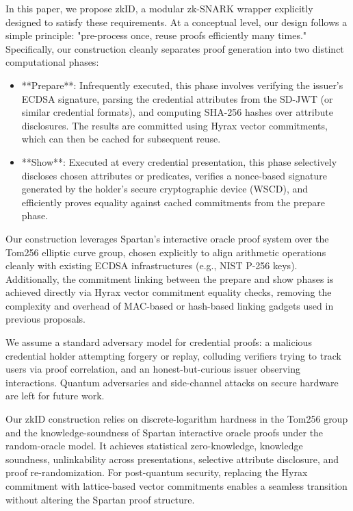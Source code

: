 In this paper, we propose zkID, a modular zk-SNARK wrapper explicitly designed to satisfy these requirements. At a conceptual level, our design follows a simple principle: "pre-process once, reuse proofs efficiently many times." Specifically, our construction cleanly separates proof generation into two distinct computational phases:
\begin{itemize}
    \item **Prepare**: Infrequently executed, this phase involves verifying the issuer's ECDSA signature, parsing the credential attributes from the SD-JWT (or similar credential formats), and computing SHA-256 hashes over attribute disclosures. The results are committed using Hyrax vector commitments, which can then be cached for subsequent reuse.
    \item **Show**: Executed at every credential presentation, this phase selectively discloses chosen attributes or predicates, verifies a nonce-based signature generated by the holder's secure cryptographic device (WSCD), and efficiently proves equality against cached commitments from the prepare phase.
\end{itemize}

Our construction leverages Spartan’s interactive oracle proof system over the Tom256 elliptic curve group, chosen explicitly to align arithmetic operations cleanly with existing ECDSA infrastructures (e.g., NIST P-256 keys). Additionally, the commitment linking between the prepare and show phases is achieved directly via Hyrax vector commitment equality checks, removing the complexity and overhead of MAC-based or hash-based linking gadgets used in previous proposals.

We assume a standard adversary model for credential proofs: a malicious credential holder attempting forgery or replay, colluding verifiers trying to track users via proof correlation, and an honest-but-curious issuer observing interactions. Quantum adversaries and side-channel attacks on secure hardware are left for future work.

Our zkID construction relies on discrete-logarithm hardness in the Tom256 group and the knowledge-soundness of Spartan interactive oracle proofs under the random-oracle model. It achieves statistical zero-knowledge, knowledge soundness, unlinkability across presentations, selective attribute disclosure, and proof re-randomization. For post-quantum security, replacing the Hyrax commitment with lattice-based vector commitments enables a seamless transition without altering the Spartan proof structure.

